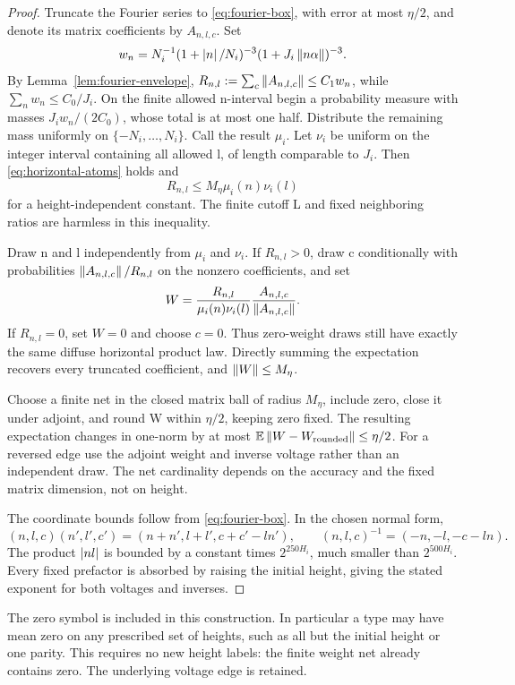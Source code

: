\begin{proof}
Truncate the Fourier series to \eqref{eq:fourier-box}, with error at most
\(\eta/2\), and denote its matrix coefficients by \(A_{n,l,c}\).  Set
\[
 w_n=N_i^{-1}(1+\left\lvert n\right\rvert/N_i)^{-3}
             (1+J_i\left\lVert n\alpha\right\rVert)^{-3}.
\]
By Lemma~\ref{lem:fourier-envelope},
\(R_{n,l}:=\sum_c\left\lVert A_{n,l,c}\right\rVert\leq C_1w_n\), while
\(\sum_nw_n\leq C_0/J_i\).  On the finite allowed n-interval begin a
probability measure with masses \(J_iw_n/(2C_0)\), whose total is at most
one half.  Distribute the remaining mass uniformly on
\(\{-N_i,\ldots,N_i\}\).  Call the result \(\mu_i\).  Let \(\nu_i\) be
uniform on the integer interval containing all allowed l, of length comparable
to \(J_i\).  Then \eqref{eq:horizontal-atoms} holds and
\[
 R_{n,l}\leq M_\eta\mu_i(n)\nu_i(l)
\]
for a height-independent constant.  The finite cutoff L and fixed neighboring
ratios are harmless in this inequality.

Draw n and l independently from \(\mu_i\) and \(\nu_i\).  If \(R_{n,l}>0\),
draw c conditionally with probabilities \(\left\lVert A_{n,l,c}\right\rVert/R_{n,l}\) on the
nonzero coefficients, and set
\[
 W=\frac{R_{n,l}}{\mu_i(n)\nu_i(l)}
         \frac{A_{n,l,c}}{\left\lVert A_{n,l,c}\right\rVert}.
\]
If \(R_{n,l}=0\), set \(W=0\) and choose \(c=0\).  Thus zero-weight draws
still have exactly the same diffuse horizontal product law.  Directly summing
the expectation recovers every truncated coefficient, and \(\left\lVert W\right\rVert\leq
M_\eta\).

Choose a finite net in the closed matrix ball of radius \(M_\eta\), include
zero, close it under adjoint, and round W within \(\eta/2\), keeping zero
fixed.  The resulting expectation changes in one-norm by at most
\(\mathbb E\left\lVert W-W_{\rm rounded}\right\rVert\leq\eta/2\).  For a reversed edge use
the adjoint weight and inverse voltage rather than an independent draw.
The net cardinality depends on the accuracy and the fixed matrix dimension,
not on height.

The coordinate bounds follow from \eqref{eq:fourier-box}.  In the chosen normal
form,
\[
 (n,l,c)(n',l',c')=(n+n',l+l',c+c'-ln'),\qquad
 (n,l,c)^{-1}=(-n,-l,-c-ln).
\]
The product \(\left\lvert nl\right\rvert\) is bounded by a constant times \(2^{250H_i}\), much
smaller than \(2^{500H_i}\).  Every fixed prefactor is absorbed by raising
the initial height, giving the stated exponent for both voltages and inverses.
\end{proof}

The zero symbol is included in this construction.  In particular a type may
have mean zero on any prescribed set of heights, such as all but the initial
height or one parity.  This requires no new height labels: the finite weight
net already contains zero.  The underlying voltage edge is retained.

